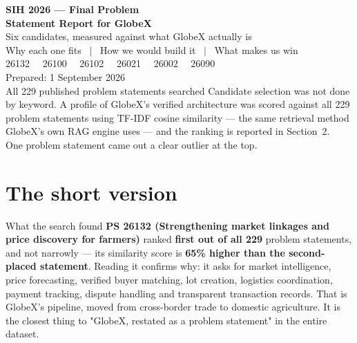 \documentclass[11pt]{article}
\begin{document}
\begin{titlepage}
\centering
\vspace*{1.6cm}
{\Huge\bfseries\color{gxteal} SIH 2026 --- Final Problem}\\[0.4em]
{\Huge\bfseries\color{gxteal} Statement Report for GlobeX}\\[1.8em]
{\Large\color{gxslate} Six candidates, measured against what GlobeX actually is}\\[2.6em]
{\large\color{gxslate} Why each one fits \ $\vert$ \ How we would build it \ $\vert$ \ What makes us win}\\[3em]
{\normalsize\color{gxslate} 26132 \ \ 26100 \ \ 26102 \ \ 26021 \ \ 26002 \ \ 26090}\\[2.4em]
{\normalsize\color{gxslate} Prepared: 1 September 2026}\\[0.3em]
{\normalsize\color{gxslate} All 229 published problem statements searched}
\vfill
{\small\color{gxslate} Candidate selection was not done by keyword. A profile of GlobeX's verified
architecture was scored against all 229 problem statements using TF-IDF cosine similarity --- the same
retrieval method GlobeX's own RAG engine uses --- and the ranking is reported in Section~2.\\
One problem statement came out a clear outlier at the top.}
\end{titlepage}

\section{The short version}

\begin{callout}{What the search found}
\textbf{PS 26132 (Strengthening market linkages and price discovery for farmers)} ranked \textbf{first out
of all 229} problem statements, and not narrowly --- its similarity score is \textbf{65\% higher than the
second-placed statement}. Reading it confirms why: it asks for market intelligence, price forecasting,
verified buyer matching, lot creation, logistics coordination, payment tracking, dispute handling and
transparent transaction records. That is GlobeX's pipeline, moved from cross-border trade to domestic
agriculture. It is the closest thing to "GlobeX, restated as a problem statement" in the entire dataset.
\end{callout}
\end{document}
